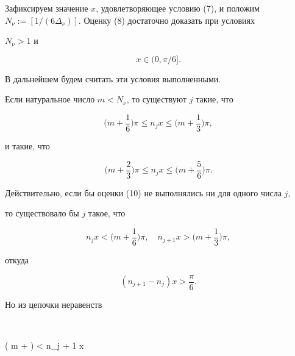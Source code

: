 Зафиксируем значение $x$, удовлетворяющее условию (7), и положим $N_{\nu}


:= [1 / (6 \Delta_{\nu})]$. Оценку (8) достаточно доказать при условиях


$N_{\nu} > 1$ и


\begin{equation}


x \in (0, \pi / 6].


\end{equation}


В дальнейшем будем считать эти условия выполненными.





Если натуральное число $m < N_{\nu}$, то существуют $j$ такие, что


\begin{equation}


\bigg ( m + \frac{1}{6} \bigg ) \pi \le n_j x \le


\bigg ( m + \frac{1}{3} \bigg ) \pi,


\end{equation}


и такие, что


\begin{equation}


\bigg ( m + \frac{2}{3} \bigg ) \pi \le n_j x \le


\bigg ( m + \frac{5}{6} \bigg ) \pi.


\end{equation}


Действительно, если бы оценки (10) не выполнялись ни для одного числа $j$,


то существовало бы $j$ такое, что


$$


n_j x < \bigg ( m + \frac{1}{6} \bigg ) \pi, \quad


n_{j + 1} x > \bigg ( m + \frac{1}{3} \bigg ) \pi,


$$


откуда


\begin{equation}


(n_{j + 1} - n_j ) x > \frac{\pi}{6}.


\end{equation}


Но из цепочки неравенств


$$


\bigg ( m +  \bigg ) \pi < n_{j + 1} x \le


